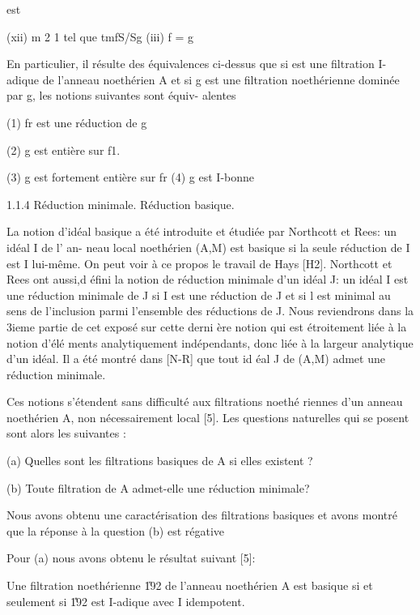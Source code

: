 \documentclass[11pt, twoside]{article}
\begin{document}
est

(xii) m 2 1 tel que tmfS/Sg (iii) f = g

En particulier, il r\'{e}sulte des \'{e}quivalences ci-dessus que si est une
filtration I-adique de l'anneau noeth\'{e}rien A et si g est une filtration
noeth\'{e}rienne domin\'{e}e par g, les notions suivantes sont \'{e}quiv-
alentes

(1) fr est une r\'{e}duction de g

(2) g est enti\`{e}re sur f1.

(3) g est fortement enti\`{e}re sur fr (4) g est I-bonne

1.1.4 R\'{e}duction minimale. R\'{e}duction basique.

La notion d'id\'{e}al basique a \'{e}t\'{e} introduite et \'{e}tudi\'{e}e
par Northcott et Rees: un id\'{e}al I de l' an- neau local noeth\'{e}rien
(A,M) est basique si la seule r\'{e}duction de I est I lui-m\^{e}me. On peut
voir \`{a} ce propos le travail de Hays [H2]. Northcott et Rees ont aussi,d%
\'{e}fini la notion de r\'{e}duction minimale d'un id\'{e}al J: un id\'{e}al
I est une r\'{e}duction minimale de J si I est une r\'{e}duction de J et si
l est minimal au sens de l'inclusion parmi l'ensemble des r\'{e}ductions de
J. Nous reviendrons dans la 3ieme partie de cet expos\'{e} sur cette derni%
\`{e}re notion qui est \'{e}troitement li\'{e}e \`{a} la notion d'\'{e}l\'{e}%
ments analytiquement ind\'{e}pendants, donc li\'{e}e \`{a} la largeur
analytique d'un id\'{e}al. Il a \'{e}t\'{e} montr\'{e} dans [N-R] que tout id%
\'{e}al J de (A,M) admet une r\'{e}duction minimale.

Ces notions s'\'{e}tendent sans difficult\'{e} aux filtrations noeth\'{e}%
riennes d'un anneau noeth\'{e}rien A, non n\'{e}cessairement local [5]. Les
questions naturelles qui se posent sont alors les suivantes :

(a) Quelles sont les filtrations basiques de A si elles existent ?

(b) Toute filtration de A admet-elle une r\'{e}duction minimale?

Nous avons obtenu une caract\'{e}risation des filtrations basiques et avons
montr\'{e} que la r\'{e}ponse \`{a} la question (b) est r\'{e}gative

Pour (a) nous avons obtenu le r\'{e}sultat suivant [5]:

Une filtration noeth\'{e}rienne \U{192} de l'anneau noeth\'{e}rien A est
basique si et seulement si \U{192} est I-adique avec I idempotent.
\end{document}
